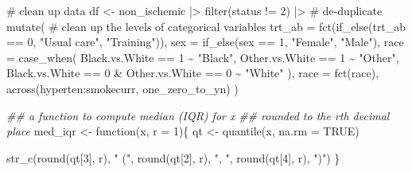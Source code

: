 \documentclass[
  letterpaper,
  DIV=11,
  numbers=noendperiod]{scrreprt}
\newenvironment{Shaded}{\begin{snugshade}}{\end{snugshade}}
\newcommand{\AttributeTok}[1]{\textcolor[rgb]{0.40,0.45,0.13}{#1}}
\newcommand{\CommentTok}[1]{\textcolor[rgb]{0.37,0.37,0.37}{#1}}
\newcommand{\ConstantTok}[1]{\textcolor[rgb]{0.56,0.35,0.01}{#1}}
\newcommand{\ControlFlowTok}[1]{\textcolor[rgb]{0.00,0.23,0.31}{#1}}
\newcommand{\DecValTok}[1]{\textcolor[rgb]{0.68,0.00,0.00}{#1}}
\newcommand{\DocumentationTok}[1]{\textcolor[rgb]{0.37,0.37,0.37}{\textit{#1}}}
\newcommand{\FunctionTok}[1]{\textcolor[rgb]{0.28,0.35,0.67}{#1}}
\newcommand{\NormalTok}[1]{\textcolor[rgb]{0.00,0.23,0.31}{#1}}
\newcommand{\OtherTok}[1]{\textcolor[rgb]{0.00,0.23,0.31}{#1}}
\newcommand{\SpecialCharTok}[1]{\textcolor[rgb]{0.37,0.37,0.37}{#1}}
\newcommand{\StringTok}[1]{\textcolor[rgb]{0.13,0.47,0.30}{#1}}
\begin{document}
\begin{Shaded}
\begin{Highlighting}[]
\CommentTok{\# clean up data}
\NormalTok{df }\OtherTok{\textless{}{-}}\NormalTok{ non\_ischemic }\SpecialCharTok{|\textgreater{}} 
  \FunctionTok{filter}\NormalTok{(status }\SpecialCharTok{!=} \DecValTok{2}\NormalTok{) }\SpecialCharTok{|\textgreater{}}  \CommentTok{\# de{-}duplicate}
  \FunctionTok{mutate}\NormalTok{( }\CommentTok{\# clean up the levels of categorical variables}
    \AttributeTok{trt\_ab =} \FunctionTok{fct}\NormalTok{(}\FunctionTok{if\_else}\NormalTok{(trt\_ab }\SpecialCharTok{==} \DecValTok{0}\NormalTok{, }\StringTok{"Usual care"}\NormalTok{, }\StringTok{"Training"}\NormalTok{)),}
    \AttributeTok{sex =} \FunctionTok{if\_else}\NormalTok{(sex }\SpecialCharTok{==} \DecValTok{1}\NormalTok{, }\StringTok{"Female"}\NormalTok{, }\StringTok{"Male"}\NormalTok{),}
    \AttributeTok{race =} \FunctionTok{case\_when}\NormalTok{(}
\NormalTok{      Black.vs.White }\SpecialCharTok{==} \DecValTok{1} \SpecialCharTok{\textasciitilde{}} \StringTok{"Black"}\NormalTok{,}
\NormalTok{      Other.vs.White }\SpecialCharTok{==} \DecValTok{1} \SpecialCharTok{\textasciitilde{}} \StringTok{"Other"}\NormalTok{,}
\NormalTok{      Black.vs.White }\SpecialCharTok{==} \DecValTok{0} \SpecialCharTok{\&}\NormalTok{ Other.vs.White }\SpecialCharTok{==} \DecValTok{0} \SpecialCharTok{\textasciitilde{}} \StringTok{"White"}
\NormalTok{    ),}
    \AttributeTok{race =} \FunctionTok{fct}\NormalTok{(race),}
    \FunctionTok{across}\NormalTok{(hyperten}\SpecialCharTok{:}\NormalTok{smokecurr, one\_zero\_to\_yn)}
\NormalTok{  ) }


\DocumentationTok{\#\# a function to compute median (IQR) for x}
\DocumentationTok{\#\# rounded to the rth decimal place}
\NormalTok{med\_iqr }\OtherTok{\textless{}{-}} \ControlFlowTok{function}\NormalTok{(x, }\AttributeTok{r =} \DecValTok{1}\NormalTok{)\{}
\NormalTok{  qt }\OtherTok{\textless{}{-}} \FunctionTok{quantile}\NormalTok{(x, }\AttributeTok{na.rm =} \ConstantTok{TRUE}\NormalTok{)}
  
  \FunctionTok{str\_c}\NormalTok{(}\FunctionTok{round}\NormalTok{(qt[}\DecValTok{3}\NormalTok{], r), }\StringTok{" ("}\NormalTok{, }
        \FunctionTok{round}\NormalTok{(qt[}\DecValTok{2}\NormalTok{], r), }\StringTok{", "}\NormalTok{,}
        \FunctionTok{round}\NormalTok{(qt[}\DecValTok{4}\NormalTok{], r), }\StringTok{")"}\NormalTok{)}
\NormalTok{\}}


\end{Highlighting}
\end{Shaded}
\end{document}
